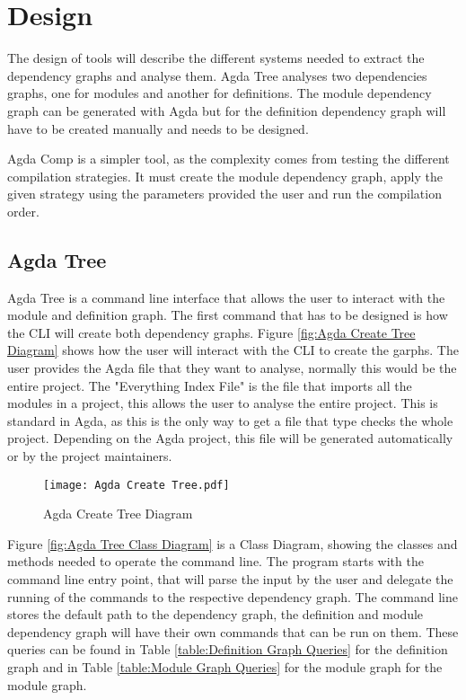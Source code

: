 
\chapter{Design}


The design of tools will describe the different systems needed to extract the
dependency graphs and analyse them. Agda Tree analyses two dependencies graphs,
one for modules and another for definitions. The module dependency graph can be
generated with Agda but for the definition dependency graph will have to be
created manually and needs to be designed.

Agda Comp is a simpler tool, as the complexity comes from testing the different
compilation strategies. It must create the module dependency graph, apply the
given strategy using the parameters provided the user and run the compilation
order. 


\pagebreak

\section{Agda Tree}

Agda Tree is a command line interface that allows the user to interact with the
module and definition graph. The first command that has to be designed is how
the CLI will create both dependency graphs. Figure \ref{fig:Agda Create Tree
Diagram} shows how the user will interact with the CLI to create the garphs.
The user provides the Agda file that they want to analyse, normally this would
be the entire project. The "Everything Index File" is the file that imports all
the modules in a project, this allows the user to analyse the entire project.
This is standard in Agda, as this is the only way to get a file that type
checks the whole project. Depending on the Agda project, this file will be
generated automatically or by the project maintainers.
\begin{figure}[H]
    \centering
    \label{fig:Agda Create Tree Diagram}
    \texttt{[image: Agda Create Tree.pdf]}
    \caption{Agda Create Tree Diagram}
\end{figure} 

\pagebreak

Figure \ref{fig:Agda Tree Class Diagram} is a Class Diagram, showing the
classes and methods needed to operate the command line. The program starts with
the command line entry point, that will parse the input by the user and
delegate the running of the commands to the respective dependency graph. The
command line stores the default path to the dependency graph, the definition
and module dependency graph will have their own commands that can be run on
them. These queries can be found in Table \ref{table:Definition Graph Queries}
for the definition graph and in Table \ref{table:Module Graph Queries} for the
module graph for the module graph.


